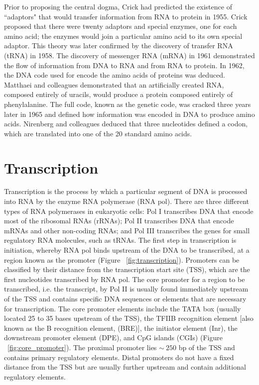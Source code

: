 Prior to proposing the central dogma, Crick had predicted the existence of ``adaptors" that would transfer information from RNA to protein in 1955\cite{cricktrna1955}. Crick proposed that there were twenty adaptors and special enzymes, one for each amino acid; the enzymes would join a particular amino acid to its own special adaptor. This theory was later confirmed by the discovery of transfer RNA (tRNA) in 1958\cite{pmid13538965}. The discovery of messenger RNA (mRNA) in 1961 \cite{BRENNER1961} demonstrated the flow of information from DNA to RNA and from RNA to protein. In 1962, the DNA code used for encode the amino acids of proteins was deduced\cite{pmid14471390}. Matthaei and colleagues demonstrated that an artificially created RNA, composed entirely of uracils, would produce a protein composed entirely of phenylalanine. The full code, known as the genetic code, was cracked three years later in 1965\cite{pmid5330357} and defined how information was encoded in DNA to produce amino acids. Nirenberg and colleagues deduced that three nucleotides defined a codon, which are translated into one of the 20 standard amino acids.

\section{Transcription}

Transcription is the process by which a particular segment of DNA is processed into RNA by the enzyme RNA polymerase (RNA pol). There are three different types of RNA polymerases in eukaryotic cells: Pol I transcribes DNA that encode most of the ribosomal RNAs (rRNAs); Pol II transcribes DNA that encode mRNAs and other non-coding RNAs; and Pol III transcribes the genes for small regulatory RNA molecules, such as tRNAs. The first step in transcription is initiation, whereby RNA pol binds upstream of the DNA to be transcribed, at a region known as the promoter (Figure ~\ref{fig:transcription}). Promoters can be classified by their distance from the transcription start site (TSS), which are the first nucleotides transcribed by RNA pol. The core promoter for a region to be transcribed, i.e. the transcript, by Pol II is usually found immediately upstream of the TSS and contains specific DNA sequences or elements that are necessary for transcription. The core promoter elements include the TATA box (usually located 25 to 35 bases upstream of the TSS), the TFIIB recognition element [also known as the B recognition element, (BRE)], the initiator element (Inr), the downstream promoter element (DPE), and CpG islands (CGIs) (Figure ~\ref{fig:core_promoter}). The proximal promoter lies $\sim~250$ bp of the TSS and contains primary regulatory elements. Distal promoters do not have a fixed distance from the TSS but are usually further upstream and contain additional regulatory elements.


